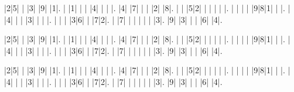 \documentclass[,landscape,letterpaper,10pt]{article}
\title{}
\author{Germán Avendaño Ramírez}
\begin{document}
\begin{multicols}{2}
\begin{sudoku}
|2|5| | |3| |9| |1|.
| |1| | | |4| | | |.
|4| |7| | | |2| |8|.
| | |5|2| | | | | |.
| | | | |9|8|1| | |.
| |4| | | |3| | | |.
| | | |3|6| | |7|2|.
| |7| | | | | | |3|.
|9| |3| | | |6| |4|.
\end{sudoku}
\begin{sudoku}
|2|5| | |3| |9| |1|.
| |1| | | |4| | | |.
|4| |7| | | |2| |8|.
| | |5|2| | | | | |.
| | | | |9|8|1| | |.
| |4| | | |3| | | |.
| | | |3|6| | |7|2|.
| |7| | | | | | |3|.
|9| |3| | | |6| |4|.
\end{sudoku}
\end{multicols}
\begin{sudoku}
|2|5| | |3| |9| |1|.
| |1| | | |4| | | |.
|4| |7| | | |2| |8|.
| | |5|2| | | | | |.
| | | | |9|8|1| | |.
| |4| | | |3| | | |.
| | | |3|6| | |7|2|.
| |7| | | | | | |3|.
|9| |3| | | |6| |4|.
\end{sudoku}
\end{document}
